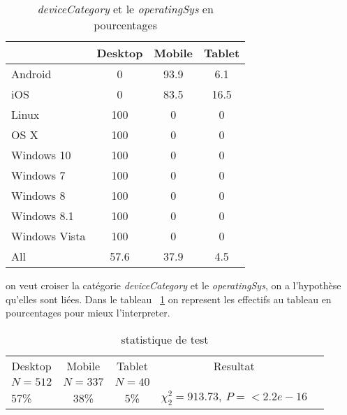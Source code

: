 \begin{table}[!hbtp]
\caption{ \emph{deviceCategory} et le \emph{operatingSys} en pourcentages} 
\begin{adjustbox}{width=0.6\textwidth}
\begin{tabular}{|l|c|c|c|}
\hline
        & \multicolumn{1}{l|}{Desktop} & \multicolumn{1}{l|}{Mobile} & \multicolumn{1}{l|}{Tablet} \\ \hline
Android & 0                         & 93.9                         & 6.1                          \\ \hline
iOS  & 0                         & 83.5                         & 16.5                          \\ \hline
Linux  & 100                         & 0                         & 0                          \\ \hline
OS X   & 100                         & 0                         & 0                          \\ \hline
Windows 10   & 100                         & 0                         & 0                          \\ \hline
Windows 7   & 100                         & 0                         & 0                          \\ \hline
Windows 8  & 100                         & 0                         & 0                          \\ \hline
Windows 8.1  & 100                         & 0                         & 0                          \\ \hline
Windows Vista   & 100                        & 0                         & 0                          \\ \hline
All   & 57.6                        & 37.9                        & 4.5                          \\ \hline
\end{tabular}
\end{adjustbox}
\label{table:deviceCategoryoperatingSys}
\end{table}

on veut croiser la catégorie \emph{deviceCategory} et le \emph{operatingSys}, on a l'hypothèse qu'elles sont liées. Dans le tableau ~\ref{table:deviceCategoryoperatingSys} on represent les effectifs au tableau en pourcentages pour mieux l'interpreter.


\begin{table}[!hbtp]
\caption{statistique de test} 
\begin{center}
\begin{tabular}{lcccc}
\hline\hline
\multicolumn{1}{c}{Desktop}&\multicolumn{1}{c}{Mobile}&\multicolumn{1}{c}{Tablet}&\multicolumn{1}{c}{Resultat}\tabularnewline
\multicolumn{1}{c}{{\scriptsize $N=512$}}&\multicolumn{1}{c}{{\scriptsize $N=337$}}&\multicolumn{1}{c}{{\scriptsize $N=40$}}&\tabularnewline
\hline
57\%&38\%&5\%&$ \chi^{2}_{2}=913.73,~ P=< 2.2e-16  $\tabularnewline
\hline
\end{tabular}
\end{center}
\label{table:testChiDeux}
\end{table}


